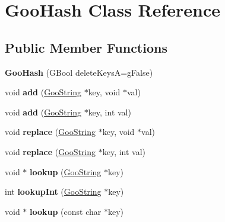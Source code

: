 \hypertarget{class_goo_hash}{}\section{Goo\+Hash Class Reference}
\label{class_goo_hash}
\subsection*{Public Member Functions}
\begin{DoxyCompactItemize}
\item 
\mbox{\label{class_goo_hash_ae1139fbf608bccdbffd82385ea1ab45a}} 
{\bfseries Goo\+Hash} (G\+Bool delete\+KeysA=g\+False)
\item 
\mbox{\label{class_goo_hash_a40ba678a351d45513169b9060230e661}} 
void {\bfseries add} (\hyperlink{class_goo_string}{Goo\+String} $\ast$key, void $\ast$val)
\item 
\mbox{\label{class_goo_hash_a56d543a585ad2d0376ceae6fb87dd3c8}} 
void {\bfseries add} (\hyperlink{class_goo_string}{Goo\+String} $\ast$key, int val)
\item 
\mbox{\label{class_goo_hash_a39cf0d7b173c6d96ebe640a8be0df3b3}} 
void {\bfseries replace} (\hyperlink{class_goo_string}{Goo\+String} $\ast$key, void $\ast$val)
\item 
\mbox{\label{class_goo_hash_a147ed3829314e218869fb2a7a4f4ee47}} 
void {\bfseries replace} (\hyperlink{class_goo_string}{Goo\+String} $\ast$key, int val)
\item 
\mbox{\label{class_goo_hash_a41a9bfaeca2dd94755cf8f12997264f1}} 
void $\ast$ {\bfseries lookup} (\hyperlink{class_goo_string}{Goo\+String} $\ast$key)
\item 
\mbox{\label{class_goo_hash_a0ed653d882bf9aee84c32716bdff46d1}} 
int {\bfseries lookup\+Int} (\hyperlink{class_goo_string}{Goo\+String} $\ast$key)
\item 
\mbox{\label{class_goo_hash_ae4b2225575f3670456b8615a08623edd}} 
void $\ast$ {\bfseries lookup} (const char $\ast$key)
\item 

\end{DoxyCompactItemize}
